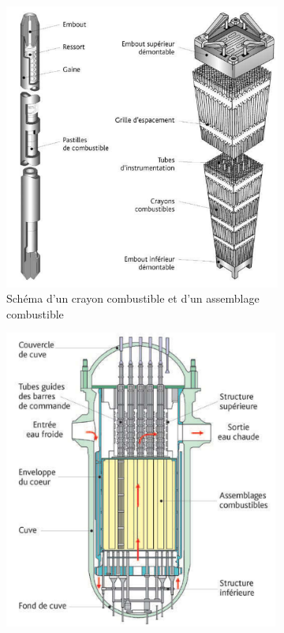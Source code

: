 \documentclass[a4paper,11pt,fleqn]{report}    %
\begin{document}
\begin{figure}[H]
	     \begin{subfigure}[t]{0.45\textwidth}
	     	\centering
	         \includegraphics[width=1\textwidth]{figure/assemb.png}
	         \caption{Schéma d'un crayon combustible et d'un assemblage combustible}
	         \label{subfig:example-image-c}
	     \end{subfigure}%
     	\hfil
     	\begin{subfigure}[t]{0.45\textwidth}
     	\centering
     	\includegraphics[width=0.99\textwidth]{figure/coeur_complet.png}

\end{subfigure}
\end{figure}
\end{document}
